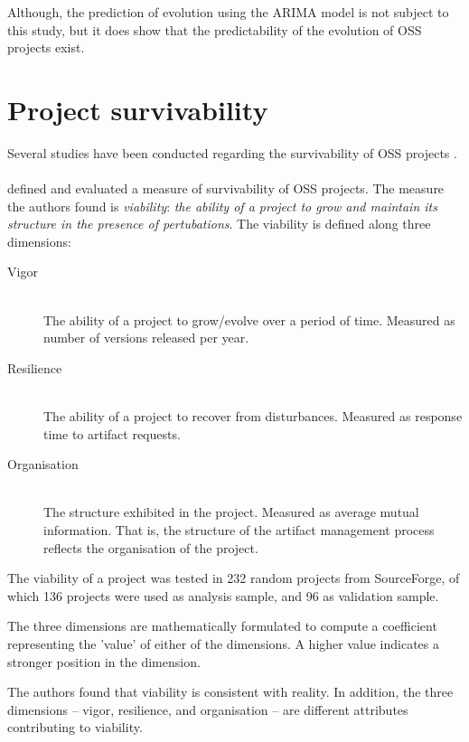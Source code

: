 Although, the prediction of evolution using the ARIMA model is not subject to
this study, but it does show that the predictability of the evolution of OSS
projects exist.



\section{Project survivability}
Several studies have been conducted regarding the survivability of OSS projects
\cite{raja2012, samoladas2010, wang2012}.

\paragraph{}
\citet{raja2012} defined and evaluated a measure of survivability of OSS
projects. The measure the authors found is \textit{viability}: \textit{the
ability of a project to grow and maintain its structure in the presence of
pertubations}. The viability is defined along three dimensions:

\begin{description}
	\item[Vigor] \hfill \\ The ability of a project to grow/evolve over a period of
		time. Measured as number of versions released per year.

	\item[Resilience] \hfill \\ The ability of a project to recover from
		disturbances. Measured as response time to artifact requests.

	\item[Organisation] \hfill \\ The structure exhibited in the project. Measured
		as average mutual information. That is, the structure of the artifact
		management process reflects the organisation of the project.
\end{description}

\noindent
The viability of a project was tested in 232 random projects from SourceForge,
of which 136 projects were used as analysis sample, and 96 as validation
sample.

The three dimensions are mathematically formulated to compute a coefficient
representing the 'value' of either of the dimensions. A higher value indicates
a stronger position in the dimension.

The authors found that viability is consistent with reality. In addition, the
three dimensions -- vigor, resilience, and organisation -- are different
attributes contributing to viability.

